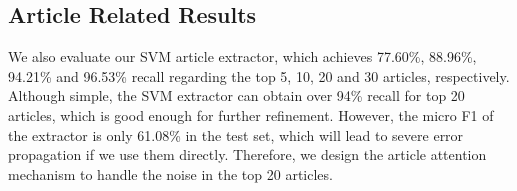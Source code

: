 \subsection{Article Related Results}
We also evaluate our SVM article extractor, which achieves 
77.60\%, 88.96\%, 94.21\% and 96.53\% recall regarding the top 5, 10, 20 and 30 articles, respectively.
Although simple, the SVM extractor can obtain over 94\% recall for top 20 articles, which is good enough for further refinement. 
However, the micro F1 of the extractor is only 61.08\% in the test set, which will lead to severe error propagation if we use them directly. Therefore, we design the article attention mechanism to handle the noise in the top 20 articles.



